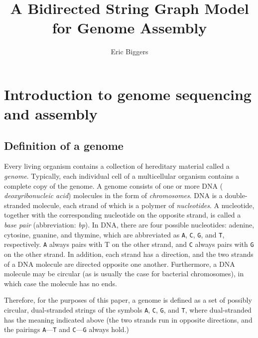 \documentclass[10pt]{article}
\title{A Bidirected String Graph Model for Genome Assembly}
\author{Eric Biggers}
\begin{document}
\maketitle

\newcommand\Base[1]{{\tt #1}}

\section{Introduction to genome sequencing and assembly}

\subsection{Definition of a genome}

Every living organism contains a collection of hereditary material called a {\em
genome}.  Typically, each individual cell of a multicellular organism contains a
complete copy of the genome.  A genome consists of one or more DNA ({\it
deoxyribonucleic acid}) molecules in the form of {\it chromosomes}.  DNA is a
double-stranded molecule, each strand of which is a polymer of {\em
nucleotides}.  A nucleotide, together with the corresponding nucleotide on the
opposite strand, is called a {\it base pair} (abbreviation: {\it bp}).  In DNA,
there are four possible nucleotides: adenine, cytosine, guanine, and thymine,
which are abbreviated as \Base{A}, \Base{C}, \Base{G}, and \Base{T},
respectively.  \Base{A} always pairs with T on the other strand, and \Base{C}
always pairs with \Base{G} on the other strand.  In addition, each strand has a
direction, and the two strands of a DNA molecule are directed opposite one
another.  Furthermore, a DNA molecule may be circular (as is usually the case
for bacterial chromosomes), in which case the molecule has no ends.

Therefore, for the purposes of this paper, a genome is defined as a set of
possibly circular, dual-stranded strings of the symbols \Base{A}, \Base{C},
\Base{G}, and \Base{T}, where dual-stranded has the meaning indicated above (the
two strands run in opposite directions, and the pairings \Base{A}---\Base{T} and
\Base{C}---\Base{G} always hold.)
\end{document}
